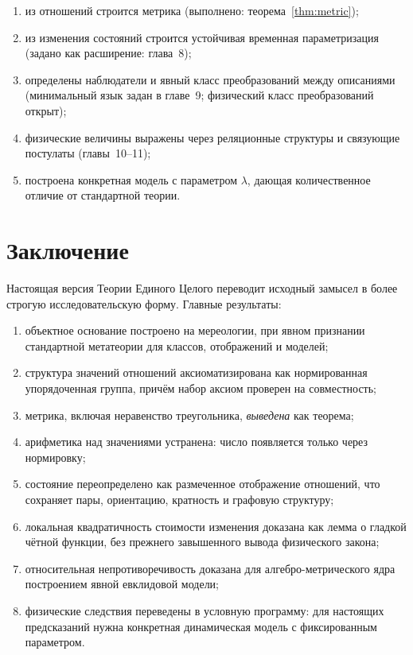 \documentclass[12pt,a4paper,oneside]{book}
\theoremstyle{definition}
\theoremstyle{plain}
\theoremstyle{remark}
\begin{document}
\begin{enumerate}
    \item из отношений строится метрика (выполнено: теорема~\ref{thm:metric});
    \item из изменения состояний строится устойчивая временная параметризация
    (задано как расширение: глава~8);
    \item определены наблюдатели и явный класс преобразований между описаниями
    (минимальный язык задан в главе~9; физический класс преобразований открыт);
    \item физические величины выражены через реляционные структуры и связующие
    постулаты (главы~10--11);
    \item построена конкретная модель с параметром $\lambda$, дающая количественное
    отличие от стандартной теории.
\end{enumerate}

\chapter{Заключение}

Настоящая версия Теории Единого Целого переводит исходный замысел в более строгую
исследовательскую форму. Главные результаты:

\begin{enumerate}
    \item объектное основание построено на мереологии, при явном признании
    стандартной метатеории для классов, отображений и моделей;
    \item структура значений отношений аксиоматизирована как нормированная
    упорядоченная группа, причём набор аксиом проверен на совместность;
    \item метрика, включая неравенство треугольника, \emph{выведена} как теорема;
    \item арифметика над значениями устранена: число появляется только через
    нормировку;
    \item состояние переопределено как размеченное отображение отношений, что
    сохраняет пары, ориентацию, кратность и графовую структуру;
    \item локальная квадратичность стоимости изменения доказана как лемма о
    гладкой чётной функции, без прежнего завышенного вывода физического закона;
    \item относительная непротиворечивость доказана для алгебро-метрического ядра
    построением явной евклидовой модели;
    \item физические следствия переведены в условную программу: для настоящих
    предсказаний нужна конкретная динамическая модель с фиксированным параметром.
\end{enumerate}
\end{document}
